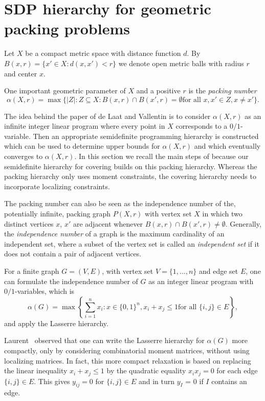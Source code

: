 \documentclass{amsart}
\begin{document}
%
%
%

\section{SDP hierarchy for geometric packing problems}
\label{sec:packing-hierarchy}

Let $X$ be a compact metric space with distance function $d$. By
$B(x,r) = \{x' \in X : d(x,x') < r\}$ we denote open metric balls with
radius $r$ and center $x$.

One important geometric parameter of $X$ and a positive $r$ is the
\emph{packing number}
\[
 \alpha(X,r) = \max\{|Z| : Z \subseteq X : B(x,r) \cap B(x',r) =
 \emptyset \text{
   for all } x, x' \in Z, x \neq x'\}.
\]

The idea behind the paper \cite{de-Laat-Vallentin-2015} of de Laat and
Vallentin is to consider $\alpha(X,r)$ as an infinite integer linear
program where every point in $X$ corresponds to a $0/1$-variable.
Then an appropriate semidefinite programming hierarchy is constructed
which can be used to determine upper bounds for $\alpha(X,r)$ and
which eventually converges to $\alpha(X,r)$. In this section we recall
the main steps of \cite{de-Laat-Vallentin-2015} because our
semidefinite hierarchy for covering builds on this packing
hierarchy. Whereas the packing hierarchy only uses moment constraints,
the covering hierarchy needs to incorporate localizing constraints.

The packing number can also be seen as the independence number of the,
potentially infinite, packing graph $P(X,r)$ with vertex set $X$ in which two
distinct vertices $x$, $x'$ are adjacent whenever
$B(x,r) \cap B(x',r) \neq \emptyset$. Generally, the \emph{independence
  number} of a graph is the maximum cardinality of an independent set,
where a subset of the vertex set is called an \emph{independent set}
if it does not contain a pair of adjacent vertices.

For a finite graph $G = (V, E)$, with vertex set
$V = \{1, \ldots, n\}$ and edge set $E$, one can formulate the
independence number of $G$ as an integer linear program with
$0/1$-variables, which is
\[
\alpha(G) =  \max\left\{\sum_{i=1}^n x_i : x \in \{0,1\}^n, x_i + x_j \leq 1 \text{
    for all } \{i,j\} \in E\right\},
\]
and apply the Lasserre hierarchy.

Laurent~\cite[Lemma 20]{Laurent-2003} observed that one can write the
Lasserre hierarchy for $\alpha(G)$ more compactly, only by considering combinatorial moment matrices, without using localizing matrices. In fact, this more compact relaxation is based on replacing the linear inequality $x_i + x_j \leq 1$ by the quadratic equality $x_i x_j = 0$ for each edge 
$\{i,j\} \in E$. This gives $y_{ij} = 0$ for $\{i,j\} \in E$ and in turn $y_I$ = 0 if $I$ contains an edge. 
\end{document}
